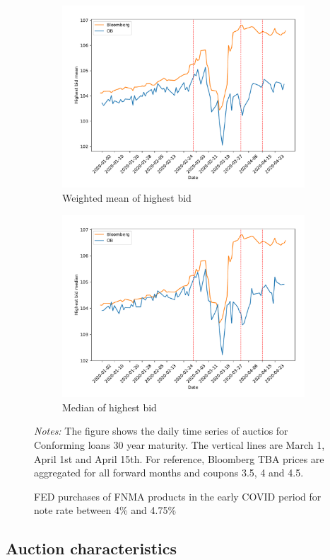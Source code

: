 \documentclass[11pt,a4paper]{article}
\begin{document}
\begin{figure}[h]
\begin{subfigure}[b]{0.49\textwidth}
      \includegraphics[width=0.998\textwidth]{../results/figures/w_winner_bid_mean_mat30_loan1_timeseries_nr_4_4.75.pdf}
      \caption{ Weighted mean of highest bid}
     \end{subfigure}
     \begin{subfigure}[b]{0.49\textwidth}
      \includegraphics[width=0.998\textwidth]{../results/figures/winner_bid_median_mat30_loan1_timeseries_nr_4_4.75.pdf}
      \caption{ Median of highest bid}
     \end{subfigure}
   \caption{FED purchases of FNMA products in the early COVID period for note rate between 4\% and 4.75\%}
   \begin{minipage}{\textwidth}
      \footnotesize{\textit{Notes:} The figure shows the daily time series of auctios for Conforming loans 30 year maturity. The vertical lines are March 1, April 1st and April 15th. For reference, Bloomberg TBA prices are aggregated for all forward months and coupons 3.5, 4 and 4.5. } 
      \end{minipage}
\end{figure}

\pagebreak

\subsection{Auction characteristics}
\end{document}
